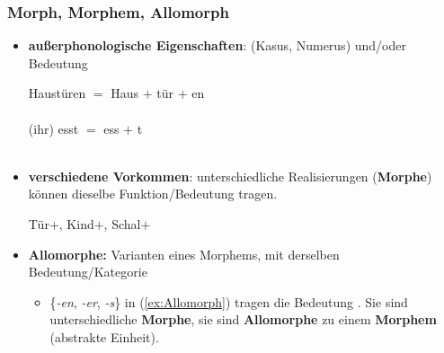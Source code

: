 \begin{frame}
\frametitle{Morph, Morphem, Allomorph}

\begin{itemize}
	\item \textbf{außerphonologische Eigenschaften}:  (\zB Kasus, Numerus) und/oder  Bedeutung
	
	\ea
		\ea
%		
		\gll Haustüren $=$ Haus $+$ tür $+$ en \\
		{} {}  {}  {}  \\
		
		\ex	
		\gll (ihr) esst $=$ ess $+$ t \\
		{} {} {}  {} \\
		
		\z
	\z 

\pause 
	
	\item \textbf{verschiedene Vorkommen}: unterschiedliche Realisierungen (\textbf{Morphe}) können dieselbe Funktion/Bedeutung tragen.
	
	\ea\label{ex:Allomorph} Tür$+$, Kind$+$, Schal$+$
	\z

\pause 
	
	\item \textbf{Allomorphe:} Varianten eines Morphems, mit derselben Bedeutung/Kategorie
	
	\begin{itemize}
		\item \{\emph{-en}, \emph{-er}, \emph{-s}\} in (\ref{ex:Allomorph}) tragen die Bedeutung . Sie sind unterschiedliche \textbf{Morphe}, sie sind \textbf{Allomorphe} zu einem \textbf{Morphem} (abstrakte Einheit).
	\end{itemize}

\end{itemize}
\end{frame}


